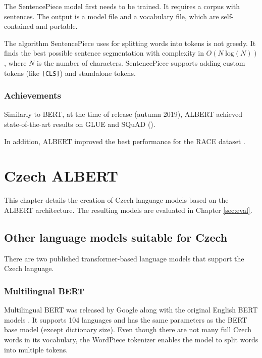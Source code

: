 \documentclass[
  printed, %
  color,   %
  table,   %
  oneside, %
  lof,     %
  lot,     %
]{fithesis3}
\begin{document}
The SentencePiece model first needs to be trained. It requires a corpus with sentences. The output is a model file and a vocabulary file, which are self-contained and portable.

The algorithm SentencePiece uses for splitting words into tokens is not greedy. It finds the best possible sentence segmentation with complexity in $O(N \  \text{log}(N))$, where $N$ is the number of characters. SentencePiece supports adding custom tokens (like \texttt{[CLS]}) and standalone tokens.


\subsection{Achievements}

Similarly to BERT, at the time of release (autumn 2019), ALBERT achieved state-of-the-art results on GLUE \parencite{glue} and SQuAD \parencite{squad} (\parencite[Tables 9 and 10]{albert}).

In addition, ALBERT improved the best performance for the RACE dataset \parencite{race}.



\chapter{Czech ALBERT}
This chapter details the creation of Czech language models based on the ALBERT architecture. The resulting models are evaluated in Chapter \ref{sec:eval}.

\section{Other language models suitable for Czech}
\label{chap:multimodels}
There are two published transformer-based language models that support the Czech language. 

\subsection{Multilingual BERT}
Multilingual BERT was released by Google along with the original English BERT models \parencite{multibert}. It supports 104 languages and has the same parameters as the BERT base model (except dictionary size). Even though there are not many full Czech words in its vocabulary, the WordPiece tokenizer enables the model to split words into multiple tokens.
\end{document}
